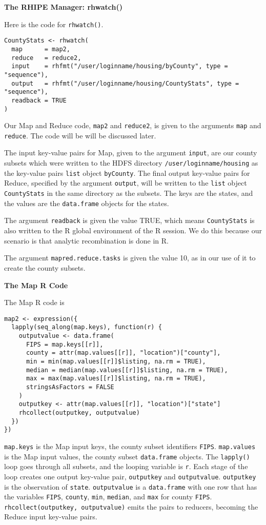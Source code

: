 \textbf{The RHIPE Manager: rhwatch()}

Here is the code for \texttt{rhwatch()}.

\begin{verbatim}
CountyStats <- rhwatch(
  map      = map2,
  reduce   = reduce2,
  input    = rhfmt("/user/loginname/housing/byCounty", type = "sequence"),
  output   = rhfmt("/user/loginname/housing/CountyStats", type = "sequence"),
  readback = TRUE
)
\end{verbatim}

Our Map and Reduce code, \texttt{map2} and \texttt{reduce2}, is given to the arguments
\texttt{map} and \texttt{reduce}. The code will be will be discussed later.

The input key-value pairs for Map, given to the argument \texttt{input},
are our county subsets which were written to the HDFS directory
\texttt{/user/loginname/housing}  as the key-value pairs \texttt{list} object \texttt{byCounty}.
The final output key-value pairs for Reduce, specified by the argument
\texttt{output}, will be written to the \texttt{list} object \texttt{CountyStats} in the same
directory as the subsets. The keys are the states, and the values are the
\texttt{data.frame} objects for the states.

The argument \texttt{readback} is given the value TRUE, which means \texttt{CountyStats} is
also written to the R global environment of the R session. We do this because
our scenario is that analytic recombination is done in R.

The argument \texttt{mapred.reduce.tasks} is given the value 10, as in our use of it
to create the county subsets.


\textbf{The Map R Code}

The Map R code is
\begin{verbatim}
map2 <- expression({
  lapply(seq_along(map.keys), function(r) {
    outputvalue <- data.frame(
      FIPS = map.keys[[r]],
      county = attr(map.values[[r]], "location")["county"],
      min = min(map.values[[r]]$listing, na.rm = TRUE),
      median = median(map.values[[r]]$listing, na.rm = TRUE),
      max = max(map.values[[r]]$listing, na.rm = TRUE),
      stringsAsFactors = FALSE
    )
    outputkey <- attr(map.values[[r]], "location")["state"]
    rhcollect(outputkey, outputvalue)
  })
})
\end{verbatim}

\texttt{map.keys} is the Map input keys, the county subset identifiers \texttt{FIPS}.
\texttt{map.values} is the Map input values, the county subset \texttt{data.frame}
objects. The \texttt{lapply()} loop goes through all subsets, and the looping
variable is \texttt{r}. Each stage of the loop creates one output key-value pair,
\texttt{outputkey} and \texttt{outputvalue}.
\texttt{outputkey} is the observation of \texttt{state}. \texttt{outputvalue} is a \texttt{data.frame}
with one row that has the variables \texttt{FIPS}, \texttt{county}, \texttt{min}, \texttt{median}, and
\texttt{max} for county \texttt{FIPS}. \texttt{rhcollect(outputkey, outputvalue)} emits the pairs
to reducers, becoming the Reduce input key-value pairs.


